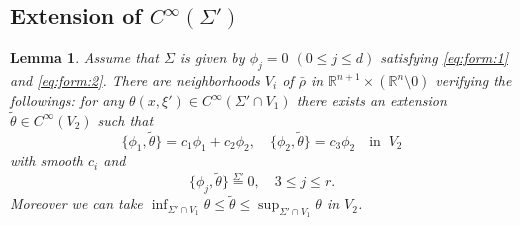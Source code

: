 \documentclass[12pt,leqno]{article} %
\def\sieq{\overset{\Sigma'}{=}}
\def\R{{\mathbb R}}
\def\bro{\bar\rho}
\def\R{\mathbb{R}}
\def\bro{\bar\rho}
\numberwithin{equation}{section}
\newtheorem{lem}{Lemma}[section]
\begin{document}
\subsection{Extension of $C^{\infty}(\Sigma')$}
%
\begin{lem}
\label{lem:kakutyo}Assume that $\Sigma$ is given by $\phi_j=0$ $(0\leq j\leq d)$ satisfying \eqref{eq:form:1} and \eqref{eq:form:2}. There are neighborhoods $V_i$ of $\bro$  in $\R^{
n+1}\times (\R^n\setminus 0)$ verifying the followings: for any $\theta(x,\xi')\in C^{\infty}(\Sigma'\cap V_1)$ there exists an extension $\tilde\theta\in C^{\infty}(V_2)$ such that 
%
\begin{equation}
\label{eq:ext:1}
\{\phi_1, \tilde\theta\}=c_1\phi_1+c_2\phi_2,\quad \{\phi_2,\tilde\theta\}=c_3\phi_2\quad \text{in}\;\;V_2
\end{equation}
%
with smooth $c_{i}$ and
%
\begin{equation}
\label{eq:ext:2}
\{\phi_j,\tilde\theta\}\sieq 0,\quad 3\leq j\leq r.
\end{equation}
%
 Moreover we can take $\inf_{\Sigma'\cap V_1} \theta\leq {\tilde\theta}\leq \sup_{\Sigma'\cap V_1}\theta$ in $V_2$. 
\end{lem}
%
%
%
\end{document}
